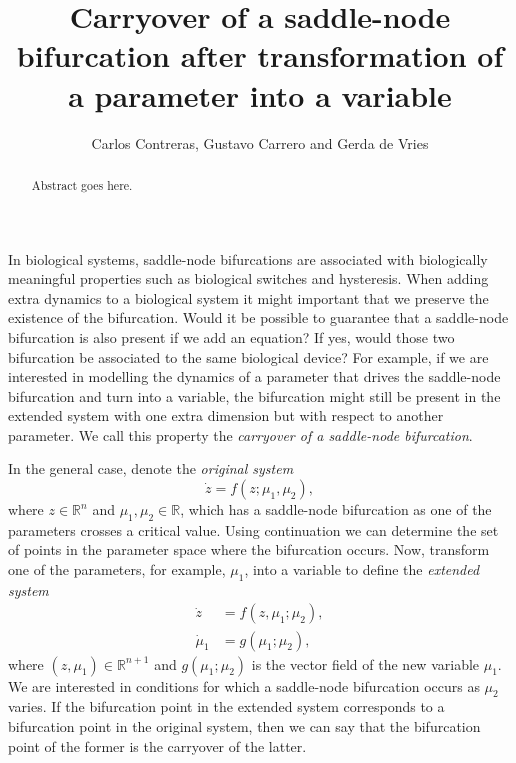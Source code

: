 \documentclass[12pt]{article}
\title{Carryover of a saddle-node bifurcation after transformation of a parameter into a variable}
\author{Carlos Contreras, Gustavo Carrero and Gerda de Vries}
\begin{document}
\maketitle


\begin{abstract}
Abstract goes here.
\end{abstract}
 

\linenumbers

In biological systems, saddle-node bifurcations are associated with biologically meaningful properties such as biological switches and hysteresis. When adding extra dynamics to a biological system it might important that we preserve the existence of the bifurcation. Would it be possible to guarantee that a saddle-node bifurcation is also present if we add an equation? If yes, would those two bifurcation be associated to the same biological device? For example, if we are interested in modelling the dynamics of a parameter that drives the saddle-node bifurcation and turn into a variable, the bifurcation might still be present in the extended system with one extra dimension but with respect to another parameter. We call this property the \textit{carryover of a saddle-node bifurcation}.

In the general case, denote the \textit{original system}
\begin{equation}
    \dot z = f(z;\mu_{1},\mu_{2}),
    \label{equ:OriginalSystem}
\end{equation}
where $z\in\mathbb{R}^{n}$ and $\mu_{1},\mu_{2}\in\mathbb{R}$,  which has a saddle-node bifurcation as one of the parameters crosses a critical value. Using continuation we can determine the set of points in the parameter space where the bifurcation occurs. Now, transform one of the parameters, for example, $\mu_{1}$, into a variable to define the \textit{extended system}
\begin{equation}
    \begin{aligned}
    \dot z &= f(z,\mu_{1}; \mu_{2}), \\
    \dot \mu_{1} &= g(\mu_{1}; \mu_{2}),
    \end{aligned}
    \label{equ:ExtendedSystem}
\end{equation}
where $(z, \mu_{1})\in\mathbb{R}^{n+1}$ and $g(\mu_{1}; \mu_{2})$ is the vector field of the new variable $\mu_{1}$. We are interested in conditions for which a saddle-node bifurcation occurs as $\mu_{2}$ varies. If the bifurcation point in the extended system corresponds to a bifurcation point in the original system, then we can say that the bifurcation point of the former is the carryover of the latter.
\end{document}
